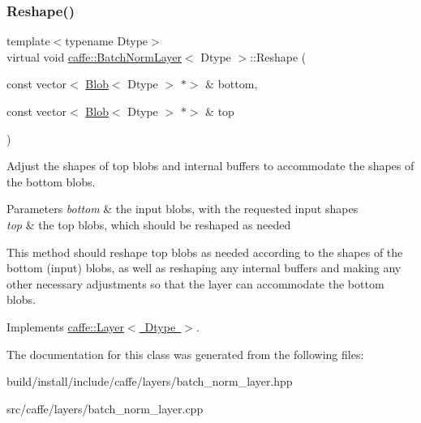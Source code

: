 \subsubsection{\texorpdfstring{Reshape()}{Reshape()}\hspace{0.1cm}{\footnotesize\ttfamily [2/2]}}
{\footnotesize\ttfamily template$<$typename Dtype$>$ \\
virtual void \mbox{\hyperlink{classcaffe_1_1_batch_norm_layer}{caffe\+::\+Batch\+Norm\+Layer}}$<$ Dtype $>$\+::Reshape (\begin{DoxyParamCaption}\item[{const vector$<$ \mbox{\hyperlink{classcaffe_1_1_blob}{Blob}}$<$ Dtype $>$ $\ast$$>$ \&}]{bottom,  }\item[{const vector$<$ \mbox{\hyperlink{classcaffe_1_1_blob}{Blob}}$<$ Dtype $>$ $\ast$$>$ \&}]{top }\end{DoxyParamCaption})\hspace{0.3cm}{\ttfamily [virtual]}}



Adjust the shapes of top blobs and internal buffers to accommodate the shapes of the bottom blobs. 


\begin{DoxyParams}{Parameters}
{\em bottom} & the input blobs, with the requested input shapes \\
\hline
{\em top} & the top blobs, which should be reshaped as needed\\
\hline
\end{DoxyParams}
This method should reshape top blobs as needed according to the shapes of the bottom (input) blobs, as well as reshaping any internal buffers and making any other necessary adjustments so that the layer can accommodate the bottom blobs. 

Implements \mbox{\hyperlink{classcaffe_1_1_layer_a7fe981e8af8d93d587acf2a952be563d}{caffe\+::\+Layer$<$ Dtype $>$}}.



The documentation for this class was generated from the following files\+:\begin{DoxyCompactItemize}
\item 
build/install/include/caffe/layers/batch\+\_\+norm\+\_\+layer.\+hpp\item 
src/caffe/layers/batch\+\_\+norm\+\_\+layer.\+cpp\end{DoxyCompactItemize}
